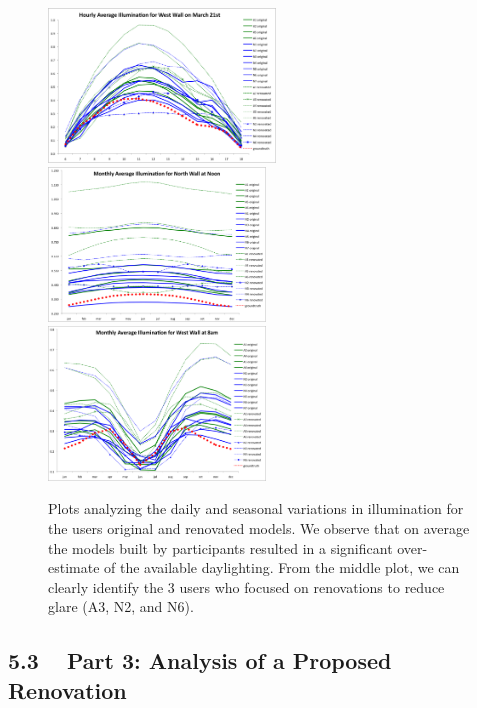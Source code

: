 \documentclass{article}
\begin{document}
\begin{figure}[t]
\includegraphics[height=1.61in]{hourly_west_march_21.png}
\includegraphics[height=1.61in]{montly_average_north_wall_noon.png}
\includegraphics[height=1.61in]{monthly_average_west_wall_8am.png}
\caption{
%
Plots analyzing the daily and seasonal variations in
illumination for the users original and renovated models.  We observe
that on average the models built by participants resulted in a
significant over-estimate of the available daylighting.  From the
middle plot, we can clearly identify the 3 users who focused on
renovations to reduce glare (A3, N2, and N6).
%
}
\label{figure:plots}
\vspace{-0.1in}
\end{figure}

\subsection{5.3 ~ Part 3: Analysis of a Proposed Renovation}
\end{document}
